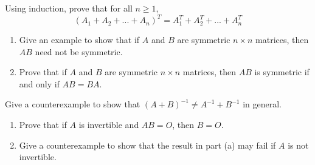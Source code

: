 \documentclass[12pt,letterpaper]{hmcpset}
\begin{document}

\begin{problem}[3.2.33]
Using induction, prove that for all $n \geq 1$, $$(A_1 + A_2 + ... + A_n)^T  = A_1^T + A_2^T + ... + A_n^T$$
\end{problem}

\begin{solution}
\vfill
\end{solution}
\newpage

\begin{problem}[3.2.36]
\begin{enumerate}
	\item
		Give an example to show that if $A$ and $B$ are symmetric $n\times n$ matrices, then $AB$ need not be symmetric.
	\item
		Prove that if $A$ and $B$ are symmetric $n\times n$ matrices, then $AB$ is symmetric if and only if $AB = BA$.
\end{enumerate}

\end{problem}

\begin{solution}
\vfill
\end{solution}
\newpage

\begin{problem}[3.3.19]
Give a counterexample to show that $(A + B)^{-1} \neq A^{-1} + B^{-1}$ in general.

\end{problem}

\begin{solution}
\vfill
\end{solution}
\newpage

\begin{problem}[3.3.42]
\begin{enumerate}
	\item
		Prove that if $A$ is invertible and $AB = O$, then $B = O$.
	\item
		Give a counterexample to show that the result in part (a) may fail if $A$ is not invertible.
\end{enumerate}

\end{problem}

\begin{solution}
\vfill
\end{solution}

\newpage
\end{document}
